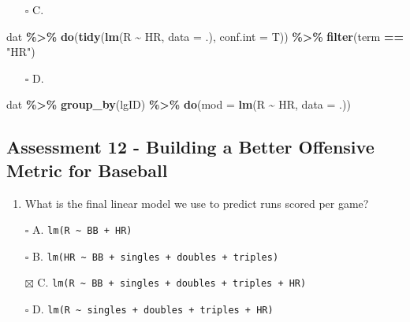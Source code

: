 \documentclass[
]{article}
\newenvironment{Shaded}{\begin{snugshade}}{\end{snugshade}}
\newcommand{\DataTypeTok}[1]{\textcolor[rgb]{0.13,0.29,0.53}{#1}}
\newcommand{\KeywordTok}[1]{\textcolor[rgb]{0.13,0.29,0.53}{\textbf{#1}}}
\newcommand{\NormalTok}[1]{#1}
\newcommand{\OperatorTok}[1]{\textcolor[rgb]{0.81,0.36,0.00}{\textbf{#1}}}
\newcommand{\StringTok}[1]{\textcolor[rgb]{0.31,0.60,0.02}{#1}}
\providecommand{\tightlist}{%
  \setlength{\itemsep}{0pt}\setlength{\parskip}{0pt}}
\begin{document}
\begin{itemize}
\tightlist
\item[$\square$]
  C.
\end{itemize}

\begin{Shaded}
\begin{Highlighting}[]
\NormalTok{dat }\OperatorTok{\%\textgreater{}\%}\StringTok{ }
\StringTok{  }\KeywordTok{do}\NormalTok{(}\KeywordTok{tidy}\NormalTok{(}\KeywordTok{lm}\NormalTok{(R }\OperatorTok{\textasciitilde{}}\StringTok{ }\NormalTok{HR, }\DataTypeTok{data =}\NormalTok{ .), }\DataTypeTok{conf.int =}\NormalTok{ T)) }\OperatorTok{\%\textgreater{}\%}\StringTok{ }
\StringTok{  }\KeywordTok{filter}\NormalTok{(term }\OperatorTok{==}\StringTok{ "HR"}\NormalTok{)}
\end{Highlighting}
\end{Shaded}

\begin{itemize}
\tightlist
\item[$\square$]
  D.
\end{itemize}

\begin{Shaded}
\begin{Highlighting}[]
\NormalTok{dat }\OperatorTok{\%\textgreater{}\%}\StringTok{ }
\StringTok{  }\KeywordTok{group\_by}\NormalTok{(lgID) }\OperatorTok{\%\textgreater{}\%}\StringTok{ }
\StringTok{  }\KeywordTok{do}\NormalTok{(}\DataTypeTok{mod =} \KeywordTok{lm}\NormalTok{(R }\OperatorTok{\textasciitilde{}}\StringTok{ }\NormalTok{HR, }\DataTypeTok{data =}\NormalTok{ .))}
\end{Highlighting}
\end{Shaded}

\hypertarget{assessment-12---building-a-better-offensive-metric-for-baseball}{%
\subsection{Assessment 12 - Building a Better Offensive Metric for
Baseball}\label{assessment-12---building-a-better-offensive-metric-for-baseball}}

\begin{enumerate}
\def\labelenumi{\arabic{enumi}.}
\tightlist
\item
  What is the final linear model we use to predict runs scored per game?
\end{enumerate}

\begin{itemize}
\tightlist
\item[$\square$]
  A. \texttt{lm(R\ \textasciitilde{}\ BB\ +\ HR)}
\item[$\square$]
  B.
  \texttt{lm(HR\ \textasciitilde{}\ BB\ +\ singles\ +\ doubles\ +\ triples)}
\item[$\boxtimes$]
  C.
  \texttt{lm(R\ \textasciitilde{}\ BB\ +\ singles\ +\ doubles\ +\ triples\ +\ HR)}
\item[$\square$]
  D.
  \texttt{lm(R\ \textasciitilde{}\ singles\ +\ doubles\ +\ triples\ +\ HR)}
\end{itemize}
\end{document}
